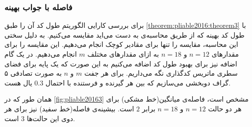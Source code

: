 \subsubsection{
	فاصله با جواب بهینه
}
برای بررسی کارایی الگوریتم
طول کد آن را طبق
\autoref{theorem:pliable2016:theorem3}
با طول کد بهینه که از طریق محاسبه‌ی
به دست می‌اید مقایسه می‌کنیم. به دلیل سختی این محاسبه، مقایسه را تنها برای مقادیر کوچک انجام می‌دهیم. این مقایسه را برای مقدارهای
$n = 12$
و
$n = 18$
به ازای مقدارهای مختلف
$m$
انجام می‌دهیم.  در
یک گام اضافه نیز برای بهبود طول کد اضافه می‌کنیم به این صورت که یک پایه برای فضای سطری ماتریس کدگذاری نگه می‌داریم. برای هر جفت
$m$
و
$n$
به صورت تصادفی ۵ گراف دوبخشی می‌سازیم که بین هر گیرنده و فرستنده با احتمال
$0.3$
یال هست.

همان طور که در
\autoref{fig:pliable20163}
	مشخص است، فاصله‌ی میانگین(خط مشکی) برای هر دو حالت
	$n = 12$
	و
	$n = 18$
	برابر
	$2$
	است. بیشینه‌ی فاصله(خط سفید) نیز برای هر دوی این حالت‌ها
	$3$
	است.
	
